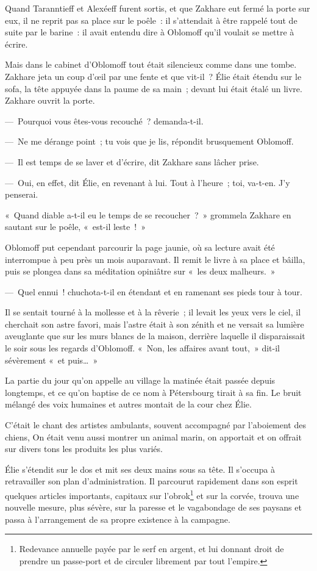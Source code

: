 \documentclass[french,twoside]{book} %
\begin{document}
\noindent Quand Taranntieff et Alexéeff furent sortis, et que Zakhare eut fermé la porte sur eux, il ne reprit pas sa place sur le poêle : il s’attendait à être rappelé tout de suite par le barine : il avait entendu dire à Oblomoff qu’il voulait se mettre à écrire.\par
Mais dans le cabinet d’Oblomoff tout était silencieux comme dans une tombe. Zakhare jeta un coup d’œil par une fente et que vit-il ? Élie était étendu sur le sofa, la tête appuyée dans la paume de sa main ; devant lui était étalé un livre. Zakhare ouvrit la porte.\par
— Pourquoi vous êtes-vous recouché ? demanda-t-il.\par
— Ne me dérange point ; tu vois que je lis, répondit brusquement Oblomoff.\par
— Il est temps de se laver et d’écrire, dit Zakhare sans lâcher prise.\par
— Oui, en effet, dit Élie, en revenant à lui. Tout à l’heure ; toi, va-t-en. J’y penserai.\par
« Quand diable a-t-il eu le temps de se recoucher ? » grommela Zakhare en sautant sur le poêle, « est-il leste ! »\par
Oblomoff put cependant parcourir la page jaunie, où sa lecture avait été interrompue à peu près un mois auparavant. Il remit le livre à sa place et bâilla, puis se plongea dans sa méditation opiniâtre sur « les deux malheurs. »\par
— Quel ennui ! chuchota-t-il en étendant et en ramenant ses pieds tour à tour.\par
Il se sentait tourné à la mollesse et à la rêverie ; il levait les yeux vers le ciel, il cherchait son astre favori, mais l’astre était à son zénith et ne versait sa lumière aveuglante que sur les murs blancs de la maison, derrière laquelle il disparaissait le soir sous les regards d’Oblomoff. « Non, les affaires avant tout, » dit-il sévèrement « et puis… »\par
La partie du jour qu’on appelle au village la matinée était passée depuis longtemps, et ce qu’on baptise de ce nom à Pétersbourg tirait à sa fin. Le bruit mélangé des voix humaines et autres montait de la cour chez Élie.\par
C’était le chant des artistes ambulants, souvent accompagné par l’aboiement des chiens, On était venu aussi montrer un animal marin, on apportait et on offrait sur divers tons les produits les plus variés.\par
Élie s’étendit sur le dos et mit ses deux mains sous sa tête. Il s’occupa à retravailler son plan d’administration. Il parcourut rapidement dans son esprit quelques articles importants, capitaux sur l’obrok\footnote{Redevance annuelle payée par le serf en argent, et lui donnant droit de prendre un passe-port et de circuler librement par tout l’empire.} et sur la corvée, trouva une nouvelle mesure, plus sévère, sur la paresse et le vagabondage de ses paysans et passa à l’arrangement de sa propre existence à la campagne.\par
\end{document}
